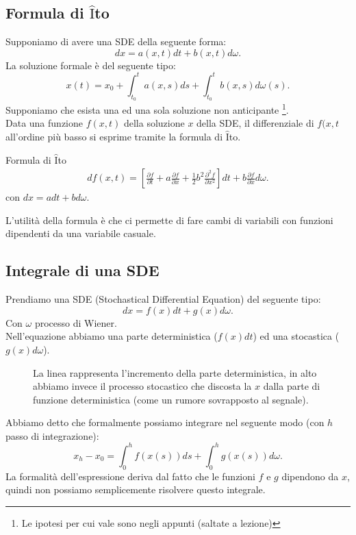 \subsection{Formula di $\hat{\text{I}}$to}%
\label{sub:Formula di ITO}
Supponiamo di avere una SDE della seguente forma:
\[
    dx = a(x,t) dt + b(x,t) d\omega
.\] 
La soluzione formale è del seguente tipo:
\[
    x(t) = x_0 + \int_{t_0}^{t} a(x,s) ds + \int_{t_0}^{t} b(x,s) d\omega (s)   
.\] 
Supponiamo che esista una ed una sola soluzione non anticipante
\footnote{Le ipotesi per cui vale sono negli appunti (saltate a lezione)}. \\
Data una funzione $f(x,t)$ della soluzione $x$ della SDE, il differenziale di $f(x, t$ all'ordine più basso si esprime tramite la formula di $\hat{\text{I}}$to.
\begin{redbox}{Formula di $\hat{\text{I}}$to}
    \[\begin{aligned}
	df(x,t) = 
	\left[\frac{\partial f}{\partial t} + 
	a \frac{\partial f}{\partial x} +
        \frac{1}{2}b^2 \frac{\partial ^2 f}{\partial x^2} \right] dt +
	b\frac{\partial f}{\partial x} d\omega 
    .\end{aligned}\]
    con $dx = adt + bd\omega$.
\end{redbox}
\noindent
L'utilità della formula è che ci permette di fare cambi di variabili con funzioni dipendenti da una variabile casuale.

\subsection{Integrale di una SDE}%
\label{sub:Integrale di una SDE}
Prendiamo una SDE (Stochastical Differential Equation) del seguente tipo:
\[
    dx = f(x) dt + g(x) d\omega
.\] 
Con $\omega$ processo di Wiener. \\
Nell'equazione abbiamo una parte deterministica ($f(x) dt$) ed una stocastica ($g(x)d\omega$).
\begin{figure}[H]
    \centering
    \caption{\scriptsize La linea rappresenta l'incremento della parte deterministica, in alto abbiamo invece il processo stocastico che discosta la $x$ dalla parte di funzione deterministica (come un rumore sovrapposto al segnale).}
    \label{fig:lez_7_int}
\end{figure}
\noindent
Abbiamo detto che formalmente possiamo integrare nel seguente modo (con $h$  passo di integrazione):
\[
    x_h - x_0 = \int_{0}^{h}  f(x(s) ) ds + \int_{0}^{h} g(x(s)) d\omega
.\] 
La formalità dell'espressione deriva dal fatto che le funzioni $f$ e $g$ dipendono da $x$, quindi non possiamo semplicemente risolvere questo integrale.
